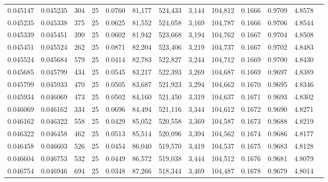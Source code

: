 \begin{tabular}{rrrrrrrrrrrrr}
0.045147 & 0.045235 &   304 &  25 &                                     0.0760 &  81,177 & 524,433 &   3,144 & 104,812 & 0.1666 & 0.9709 & 4.8578 \\
0.045235 & 0.045338 &   375 &  25 &                                     0.0625 &  81,552 & 524,058 &   3,169 & 104,787 & 0.1666 & 0.9706 & 4.8544 \\
0.045339 & 0.045451 &   390 &  25 &                                     0.0602 &  81,942 & 523,668 &   3,194 & 104,762 & 0.1667 & 0.9704 & 4.8508 \\
0.045451 & 0.045524 &   262 &  25 &                                     0.0871 &  82,204 & 523,406 &   3,219 & 104,737 & 0.1667 & 0.9702 & 4.8483 \\
0.045524 & 0.045684 &   579 &  25 &                                     0.0414 &  82,783 & 522,827 &   3,244 & 104,712 & 0.1669 & 0.9700 & 4.8430 \\
0.045685 & 0.045799 &   434 &  25 &                                     0.0545 &  83,217 & 522,393 &   3,269 & 104,687 & 0.1669 & 0.9697 & 4.8389 \\
0.045799 & 0.045933 &   470 &  25 &                                     0.0505 &  83,687 & 521,923 &   3,294 & 104,662 & 0.1670 & 0.9695 & 4.8346 \\
0.045934 & 0.046069 &   473 &  25 &                                     0.0502 &  84,160 & 521,450 &   3,319 & 104,637 & 0.1671 & 0.9693 & 4.8302 \\
0.046069 & 0.046162 &   334 &  25 &                                     0.0696 &  84,494 & 521,116 &   3,344 & 104,612 & 0.1672 & 0.9690 & 4.8271 \\
0.046162 & 0.046322 &   558 &  25 &                                     0.0429 &  85,052 & 520,558 &   3,369 & 104,587 & 0.1673 & 0.9688 & 4.8219 \\
0.046322 & 0.046458 &   462 &  25 &                                     0.0513 &  85,514 & 520,096 &   3,394 & 104,562 & 0.1674 & 0.9686 & 4.8177 \\
0.046458 & 0.046603 &   526 &  25 &                                     0.0454 &  86,040 & 519,570 &   3,419 & 104,537 & 0.1675 & 0.9683 & 4.8128 \\
0.046604 & 0.046753 &   532 &  25 &                                     0.0449 &  86,572 & 519,038 &   3,444 & 104,512 & 0.1676 & 0.9681 & 4.8079 \\
0.046754 & 0.046946 &   694 &  25 &                                     0.0348 &  87,266 & 518,344 &   3,469 & 104,487 & 0.1678 & 0.9679 & 4.8014 \\

\end{tabular}
